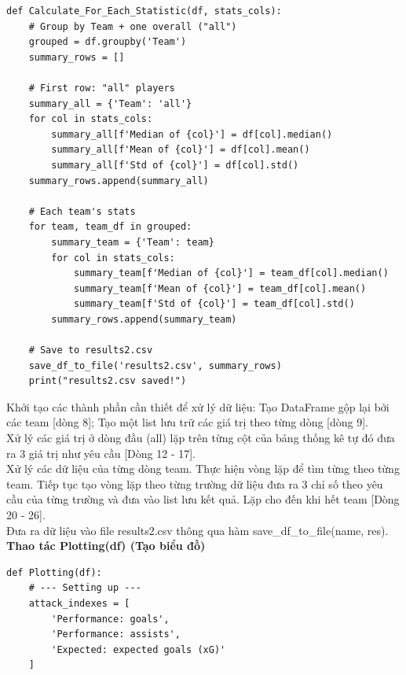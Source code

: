 \documentclass[12pt]{report}
\begin{document}
{\begin{lstlisting}
def Calculate_For_Each_Statistic(df, stats_cols):
    # Group by Team + one overall ("all")
    grouped = df.groupby('Team')
    summary_rows = []

    # First row: "all" players
    summary_all = {'Team': 'all'}
    for col in stats_cols:
        summary_all[f'Median of {col}'] = df[col].median()
        summary_all[f'Mean of {col}'] = df[col].mean()
        summary_all[f'Std of {col}'] = df[col].std()
    summary_rows.append(summary_all)

    # Each team's stats
    for team, team_df in grouped:
        summary_team = {'Team': team}
        for col in stats_cols:
            summary_team[f'Median of {col}'] = team_df[col].median()
            summary_team[f'Mean of {col}'] = team_df[col].mean()
            summary_team[f'Std of {col}'] = team_df[col].std()
        summary_rows.append(summary_team)

    # Save to results2.csv
    save_df_to_file('results2.csv', summary_rows)
    print("results2.csv saved!")
\end{lstlisting}

Khởi tạo các thành phần cần thiết để xử lý dữ liệu: Tạo DataFrame gộp lại bởi các team [dòng 8]; Tạo một list lưu trữ các giá trị theo từng dòng [dòng 9].\\
Xử lý các giá trị ở dòng đầu (all) lặp trên từng cột của bảng thống kê tự đó đưa ra 3 giá trị như yêu cầu [Dòng 12 - 17].\\
Xử lý các dữ liệu của từng dòng team. Thực hiện vòng lặp để tìm từng theo từng team. Tiếp tục tạo vòng lặp theo từng trường dữ liệu đưa ra 3 chỉ số theo yêu cầu của từng trường và đưa vào list lưu kết quả. Lặp cho đến khi hết team [Dòng 20 - 26].\\
Đưa ra dữ liệu vào file results2.csv thông qua hàm save\_df\_to\_file(name, res).\\

\textbf* {Thao tác Plotting(df) (Tạo biểu đồ)}
\begin{lstlisting}
def Plotting(df):
    # --- Setting up ---
    attack_indexes = [
        'Performance: goals',  
        'Performance: assists', 
        'Expected: expected goals (xG)'
    ]


\end{lstlisting}}
\end{document}
